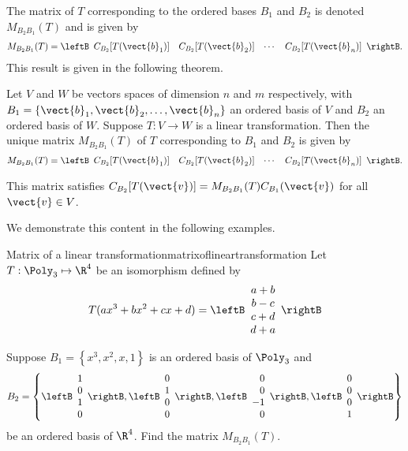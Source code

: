 The matrix of $T$ corresponding to the ordered
bases $B_1$ and $B_2$ is denoted $ M_{B_2B_1}(T)$ and is given by 
\[ M_{B_2B_1}(T)=
\leftB\begin{array}{cccc}
C_{B_2} [ T(\vect{b}_1)] & C_{B_2}[T(\vect{b}_2) ] &
\cdots & C_{B_2}[T(\vect{b}_n) ] \end{array}\rightB.\] 
This result is given in the following theorem. 

\begin{theorem}{}{}
Let $V$ and $W$ be vectors spaces of dimension
$n$ and $m$ respectively, with $B_1=\{\vect{b}_1, \vect{b}_2, \ldots, \vect{b}_n\}$ an
ordered basis of $V$ and $B_2$ an ordered basis of $W$. Suppose $T:V\to W$ is a linear transformation. Then the unique matrix $M_{B_2B_1}(T)$ of $T$ corresponding to $B_1$ and $B_2$ is given by 
\[ M_{B_2B_1}(T)=
\leftB\begin{array}{cccc}
C_{B_2}[T(\vect{b}_1)] & C_{B_2}[T(\vect{b}_2)] &
\cdots & C_{B_2}[T(\vect{b}_n)] \end{array}\rightB.\]

This matrix satisfies  $C_{B_2}[T(\vect{v})]=M_{B_2B_1}(T)C_{B_1}(\vect{v})$ for all $\vect{v}\in V$.
\end{theorem}

We demonstrate this content in the following examples. 

\begin{example}{Matrix of a linear transformation}{matrixoflineartransformation}
Let $T: \Poly_3 \mapsto \R^4$ be an isomorphism defined by
\[
T( ax^3 + bx^2 + cx + d) = \leftB \begin{array}{c}
a + b \\
b - c \\
c + d \\
d + a 
\end{array} \rightB
\]

Suppose $B_1 = \left\{ x^3, x^2, x, 1 \right\}$ is an ordered basis of $\Poly_3$ and 
\[
B_2 = \left\{ \leftB \begin{array}{r}
1 \\
0 \\
1 \\
0
\end{array} \rightB, \leftB \begin{array}{r}
0 \\
1 \\
0 \\
0
\end{array} \rightB, 
\leftB \begin{array}{r}
0 \\
0 \\
-1 \\
0
\end{array} \rightB, 
\leftB \begin{array}{r}
0 \\
0 \\
0 \\
1
\end{array} \rightB \right\} 
\]
be an ordered basis of $\R^4$.
Find the matrix $M_{B_2B_1}(T)$. 
\end{example}

